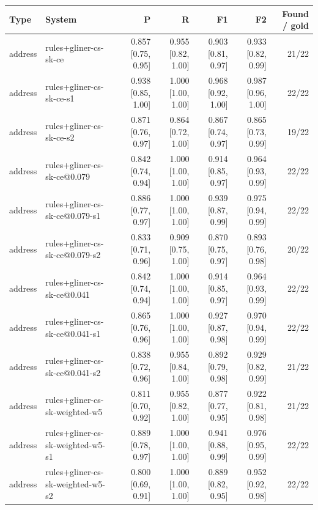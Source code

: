 \providecommand{\ci}[2]{{\scriptsize [#1, #2]}}

\begin{table}[htbp]
\centering
\small
\begin{tabular}{llrrrrr}
\toprule
Type & System & P & R & F1 & F2 & Found / gold \\
\midrule
address & rules+gliner-cs-sk-ce & 0.857 \ci{0.75}{0.95} & 0.955 \ci{0.82}{1.00} & 0.903 \ci{0.81}{0.97} & 0.933 \ci{0.82}{0.99} & 21/22 \\
address & rules+gliner-cs-sk-ce-s1 & 0.938 \ci{0.85}{1.00} & 1.000 \ci{1.00}{1.00} & 0.968 \ci{0.92}{1.00} & 0.987 \ci{0.96}{1.00} & 22/22 \\
address & rules+gliner-cs-sk-ce-s2 & 0.871 \ci{0.76}{0.97} & 0.864 \ci{0.72}{1.00} & 0.867 \ci{0.74}{0.97} & 0.865 \ci{0.73}{0.99} & 19/22 \\
address & rules+gliner-cs-sk-ce@0.079 & 0.842 \ci{0.74}{0.94} & 1.000 \ci{1.00}{1.00} & 0.914 \ci{0.85}{0.97} & 0.964 \ci{0.93}{0.99} & 22/22 \\
address & rules+gliner-cs-sk-ce@0.079-s1 & 0.886 \ci{0.77}{0.97} & 1.000 \ci{1.00}{1.00} & 0.939 \ci{0.87}{0.99} & 0.975 \ci{0.94}{0.99} & 22/22 \\
address & rules+gliner-cs-sk-ce@0.079-s2 & 0.833 \ci{0.71}{0.96} & 0.909 \ci{0.75}{1.00} & 0.870 \ci{0.75}{0.97} & 0.893 \ci{0.76}{0.98} & 20/22 \\
address & rules+gliner-cs-sk-ce@0.041 & 0.842 \ci{0.74}{0.94} & 1.000 \ci{1.00}{1.00} & 0.914 \ci{0.85}{0.97} & 0.964 \ci{0.93}{0.99} & 22/22 \\
address & rules+gliner-cs-sk-ce@0.041-s1 & 0.865 \ci{0.76}{0.96} & 1.000 \ci{1.00}{1.00} & 0.927 \ci{0.87}{0.98} & 0.970 \ci{0.94}{0.99} & 22/22 \\
address & rules+gliner-cs-sk-ce@0.041-s2 & 0.838 \ci{0.72}{0.96} & 0.955 \ci{0.84}{1.00} & 0.892 \ci{0.79}{0.98} & 0.929 \ci{0.82}{0.99} & 21/22 \\
address & rules+gliner-cs-sk-weighted-w5 & 0.811 \ci{0.70}{0.92} & 0.955 \ci{0.82}{1.00} & 0.877 \ci{0.77}{0.95} & 0.922 \ci{0.81}{0.98} & 21/22 \\
address & rules+gliner-cs-sk-weighted-w5-s1 & 0.889 \ci{0.78}{0.97} & 1.000 \ci{1.00}{1.00} & 0.941 \ci{0.88}{0.99} & 0.976 \ci{0.95}{0.99} & 22/22 \\
address & rules+gliner-cs-sk-weighted-w5-s2 & 0.800 \ci{0.69}{0.91} & 1.000 \ci{1.00}{1.00} & 0.889 \ci{0.82}{0.95} & 0.952 \ci{0.92}{0.98} & 22/22 \\

\end{tabular}
\end{table}
